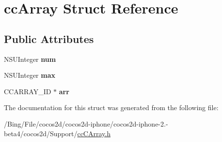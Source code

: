 \hypertarget{structcc_array}{\section{cc\-Array Struct Reference}
\label{structcc_array}
}
\subsection*{Public Attributes}
\begin{DoxyCompactItemize}
\item 
\hypertarget{structcc_array_a6dc2651d5b1948fc43ee3aac2aa8f192}{N\-S\-U\-Integer {\bfseries num}}\label{structcc_array_a6dc2651d5b1948fc43ee3aac2aa8f192}

\item 
\hypertarget{structcc_array_ac57478a8ba43e40a230eedf54cd69bd3}{N\-S\-U\-Integer {\bfseries max}}\label{structcc_array_ac57478a8ba43e40a230eedf54cd69bd3}

\item 
\hypertarget{structcc_array_a28b69df298284b763cc216456ab0606d}{C\-C\-A\-R\-R\-A\-Y\-\_\-\-I\-D $\ast$ {\bfseries arr}}\label{structcc_array_a28b69df298284b763cc216456ab0606d}

\end{DoxyCompactItemize}


The documentation for this struct was generated from the following file\-:\begin{DoxyCompactItemize}
\item 
/\-Bing/\-File/cocos2d/cocos2d-\/iphone/cocos2d-\/iphone-\/2.-\/beta4/cocos2d/\-Support/\hyperlink{cc_c_array_8h}{cc\-C\-Array.\-h}\end{DoxyCompactItemize}
